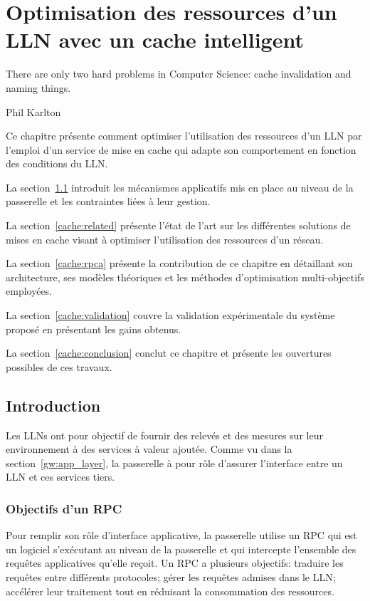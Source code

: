
\chapter{Optimisation des ressources d'un \ac{LLN} avec un cache intelligent}
\label{cache}

\epigraph{There are only two hard problems in Computer Science: cache invalidation and naming things.}{Phil Karlton}

\minitoc

Ce chapitre présente comment optimiser l'utilisation des ressources d'un \ac{LLN} par l'emploi d'un service de mise en cache qui adapte son comportement en fonction des conditions du \ac{LLN}.

La section~\ref{cache:introduction} introduit les mécanismes applicatifs mis en place au niveau de la passerelle et les contraintes liées à leur gestion.

La section~\ref{cache:related} présente l'état de l'art sur les différentes solutions de mises en cache visant à optimiser l'utilisation des ressources d'un réseau.

La section~\ref{cache:rpca} présente la contribution de ce chapitre en détaillant son architecture, ses modèles théoriques et les méthodes d'optimisation multi-objectifs employées.

La section~\ref{cache:validation} couvre la validation expérimentale du système proposé en présentant les gains obtenus.

La section~\ref{cache:conclusion} conclut ce chapitre et présente les ouvertures possibles de ces travaux.

\section{Introduction}
\label{cache:introduction}

Les \ac{LLN}s ont pour objectif de fournir des relevés et des mesures sur leur environnement à des services à valeur ajoutée.
Comme vu dans la section~\ref{gw:app_layer}, la passerelle à pour rôle d'assurer l'interface entre un \ac{LLN} et ces services tiers.

\subsection{Objectifs d'un \acl{RPC}}

Pour remplir son rôle d'interface applicative, la passerelle utilise un \acf{RPC} qui est un logiciel s'exécutant au niveau de la passerelle et qui intercepte l'ensemble des requêtes applicatives qu'elle reçoit.
Un \ac{RPC} a plusieurs objectifs: traduire les requêtes entre différents protocoles; gérer les requêtes admises dans le \ac{LLN}; accélérer leur traitement tout en réduisant la consommation des ressources.

